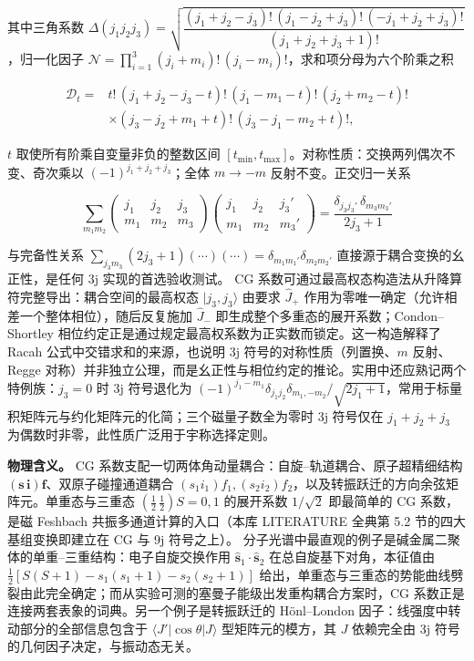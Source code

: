 \documentclass[
]{ctexbook}
\begin{document}
其中三角系数
\(\Delta(j_1j_2j_3)=\sqrt{\dfrac{(j_1+j_2-j_3)!\,(j_1-j_2+j_3)!\,(-j_1+j_2+j_3)!}{(j_1+j_2+j_3+1)!}}\)，归一化因子
\(\mathcal{N}=\prod_{i=1}^{3}(j_i+m_i)!\,(j_i-m_i)!\)，求和项分母为六个阶乘之积

\[
\begin{aligned}
\mathcal{D}_t={}&t!\,(j_1+j_2-j_3-t)!\,(j_1-m_1-t)!\,(j_2+m_2-t)!\\
&\times(j_3-j_2+m_1+t)!\,(j_3-j_1-m_2+t)!,
\end{aligned}
\]

\(t\) 取使所有阶乘自变量非负的整数区间
\([t_{\min},t_{\max}]\)。对称性质：交换两列偶次不变、奇次乘以
\((-1)^{j_1+j_2+j_3}\)；全体 \(m\to-m\) 反射不变。正交归一关系

\[\sum_{m_1m_2}\begin{pmatrix} j_1 & j_2 & j_3 \\ m_1 & m_2 & m_3\end{pmatrix}
\begin{pmatrix} j_1 & j_2 & j_3' \\ m_1 & m_2 & m_3'\end{pmatrix}
=\frac{\delta_{j_3j_3'}\,\delta_{m_3m_3'}}{2j_3+1}\]

与完备性关系
\(\sum_{j_3m_3}(2j_3+1)(\cdots)(\cdots)=\delta_{m_1m_1'}\delta_{m_2m_2'}\)
直接源于耦合变换的幺正性，是任何 3j 实现的首选验收测试。 CG
系数可通过最高权态构造法从升降算符完整导出：耦合空间的最高权态
\(|j_3,j_3\rangle\) 由要求 \(\hat{J}_{+}\)
作用为零唯一确定（允许相差一个整体相位），随后反复施加 \(\hat{J}_{-}\)
即生成整个多重态的展开系数；Condon--Shortley
相位约定正是通过规定最高权系数为正实数而锁定。这一构造解释了 Racah
公式中交错求和的来源，也说明 3j 符号的对称性质（列置换、\(m\)
反射、Regge
对称）并非独立公理，而是幺正性与相位约定的推论。实用中还应熟记两个特例族：\(j_3=0\)
时 3j 符号退化为
\((-1)^{j_1-m_1}\delta_{j_1j_2}\delta_{m_1,-m_2}/\sqrt{2j_1+1}\)，常用于标量积矩阵元与约化矩阵元的化简；三个磁量子数全为零时
3j 符号仅在 \(j_1+j_2+j_3\) 为偶数时非零，此性质广泛用于宇称选择定则。

\textbf{物理含义。} CG
系数支配一切两体角动量耦合：自旋--轨道耦合、原子超精细结构
\((\mathbf{s}\,\mathbf{i})\mathbf{f}\)、双原子碰撞通道耦合
\((s_1i_1)f_1,(s_2i_2)f_2\)，以及转振跃迁的方向余弦矩阵元。单重态与三重态
\((\tfrac12\,\tfrac12)S=0,1\) 的展开系数 \(1/\sqrt2\) 即最简单的 CG
系数，是磁 Feshbach 共振多通道计算的入口（本库 LITERATURE 全典第 5.2
节的四大基组变换即建立在 CG 与 9j 符号之上）。
分子光谱中最直观的例子是碱金属二聚体的单重--三重结构：电子自旋交换作用
\(\hat{\mathbf{s}}_1\cdot\hat{\mathbf{s}}_2\) 在总自旋基下对角，本征值由
\(\tfrac12[S(S+1)-s_1(s_1+1)-s_2(s_2+1)]\)
给出，单重态与三重态的势能曲线劈裂由此完全确定；而从实验可测的塞曼子能级出发重构耦合方案时，CG
系数正是连接两套表象的词典。另一个例子是转振跃迁的 Hönl--London
因子：线强度中转动部分的全部信息包含于
\(\langle J'|\cos\theta|J\rangle\) 型矩阵元的模方，其 \(J\) 依赖完全由
3j 符号的几何因子决定，与振动态无关。
\end{document}

